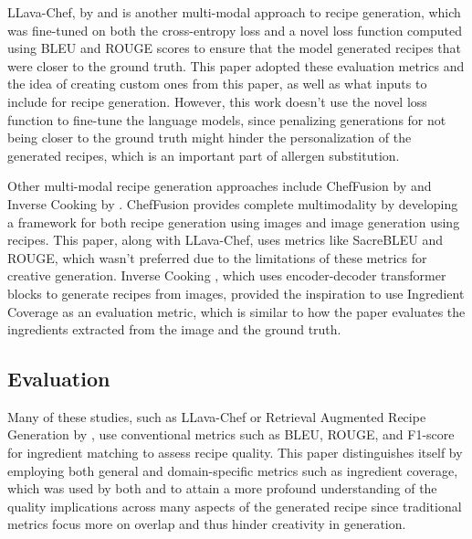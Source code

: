LLava-Chef, by \citet{Mohbat_2024} and  is another multi-modal approach to recipe generation, which was fine-tuned on both the cross-entropy loss and a novel loss function computed using BLEU and ROUGE scores to ensure that the model generated recipes that were closer to the ground truth. This paper adopted these evaluation metrics and the idea of creating custom ones from this paper, as well as what inputs to include for recipe generation. However, this work doesn't use the novel loss function to fine-tune the language models, since penalizing generations for not being closer to the ground truth might hinder the personalization of the generated recipes, which is an important part of allergen substitution.

Other multi-modal recipe generation approaches include ChefFusion by \citet{li2024cheffusion} and Inverse Cooking by \citet{salvador2019inverse}. ChefFusion provides complete multimodality by developing a framework for both recipe generation using images and image generation using recipes. This paper, along with LLava-Chef, uses metrics like SacreBLEU\cite{post-2018-call} and ROUGE, which wasn't preferred due to the limitations of these metrics for creative generation. Inverse Cooking ,  which uses encoder-decoder transformer \cite{vaswani2017attention} blocks to generate recipes from images, provided the inspiration to use Ingredient Coverage as an evaluation metric, which is similar to how the paper evaluates the ingredients extracted from the image and the ground truth.
\vspace{-5pt}
\subsection{Evaluation}
Many of these studies, such as LLava-Chef or Retrieval Augmented Recipe Generation by \citep{liu2024retrieval}, use conventional metrics such as BLEU, ROUGE, and F1-score for ingredient matching to assess recipe quality. This paper distinguishes itself by employing both general and domain-specific metrics such as ingredient coverage, which was used by both \citet{liu2022plugandplayrecipegenerationcontent} and \citet{salvador2019inverse} to attain a more profound understanding of the quality implications across many aspects of the generated recipe since traditional metrics focus more on overlap and thus hinder creativity in generation.